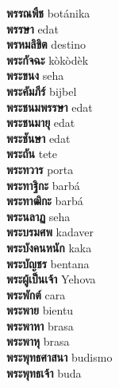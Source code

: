 \textbf{ พรรณพืช  } botánika \\
\textbf{ พรรษา  } edat \\
\textbf{ พรหมลิขิต  } destino \\
\textbf{ พระกัจฉะ  } kòkòdèk \\
\textbf{ พระขนง  } seha \\
\textbf{ พระคัมภีร์  } bijbel \\
\textbf{ พระชนมพรรษา  } edat \\
\textbf{ พระชนมายุ  } edat \\
\textbf{ พระชันษา  } edat \\
\textbf{ พระถัน  } tete \\
\textbf{ พระทวาร  } porta \\
\textbf{ พระทาฐิกะ  } barbá \\
\textbf{ พระทาฒิกะ  } barbá \\
\textbf{ พระนลาฏ  } seha \\
\textbf{ พระบรมศพ  } kadaver \\
\textbf{ พระบังคนหนัก  } kaka \\
\textbf{ พระบัญชร  } bentana \\
\textbf{ พระผู้เป็นเจ้า  } Yehova \\
\textbf{ พระพักต์  } cara \\
\textbf{ พระพาย  } bientu \\
\textbf{ พระพาหา  } brasa \\
\textbf{ พระพาหุ  } brasa \\
\textbf{ พระพุทธศาสนา  } budismo \\
\textbf{ พระพุทธเจ้า  } buda \\
